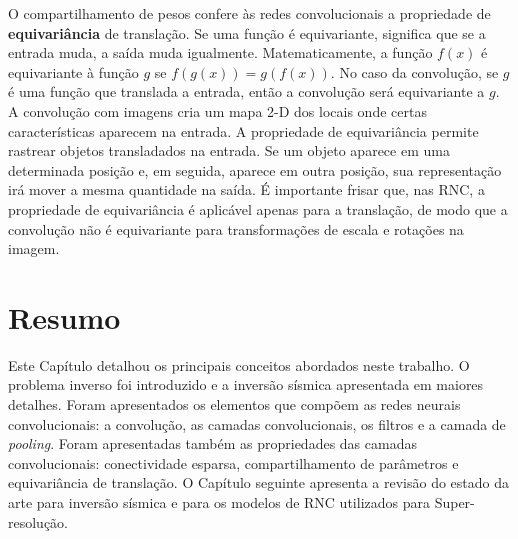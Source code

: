 O compartilhamento de pesos confere às redes convolucionais a propriedade de \textbf{equivariância} de
translação. Se uma função é equivariante, significa que se a entrada muda,
a saída muda igualmente. Matematicamente, a função $f(x)$ é equivariante à função $g$ se
$f(g(x)) = g(f(x))$. No caso da convolução, se $g$ é uma função que translada a entrada, então
a convolução será equivariante a $g$.
A convolução com imagens cria um mapa 2-D dos locais onde certas características aparecem na entrada.
A propriedade de equivariância permite rastrear objetos transladados na entrada. Se um objeto aparece
em uma determinada posição e, em seguida, aparece em outra posição, sua representação
irá mover a mesma quantidade na saída. É importante frisar que, nas RNC, a propriedade de equivariância
é aplicável apenas para a translação, de modo que a convolução não é equivariante para transformações 
de escala e rotações na imagem.

\section{Resumo}

Este Capítulo detalhou os principais conceitos abordados neste trabalho. O
problema inverso foi introduzido e a inversão sísmica apresentada em
maiores detalhes. Foram apresentados os elementos que compõem as redes
neurais convolucionais: a convolução, as camadas convolucionais, os filtros e a camada de \textit{pooling}.
Foram apresentadas também as propriedades das camadas convolucionais: conectividade esparsa,
compartilhamento de parâmetros e equivariância de translação. O Capítulo seguinte apresenta a
revisão do estado da arte para inversão sísmica e para os modelos de RNC utilizados para Super-resolução.